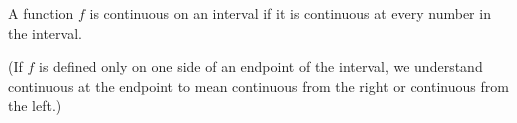 \begin{frame}
\begin{definition}
A function $f$ is continuous on an interval if it is continuous at every number in the interval.

(If $f$ is defined only on one side of an endpoint of the interval, we understand continuous at the endpoint to mean continuous from the right or continuous from the left.)
\end{definition}

\end{frame}

